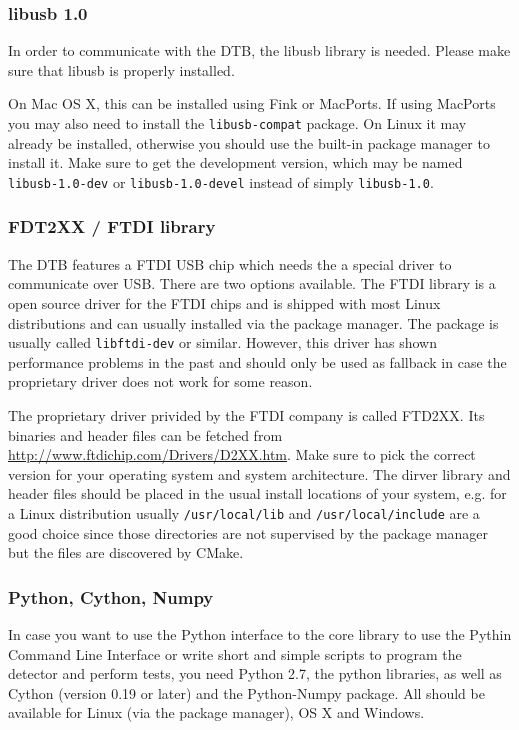 \subsubsection{libusb 1.0}
In order to communicate with the \gls{DTB}, the libusb library is needed. Please make sure that libusb is properly installed.

On Mac OS X, this can be installed using Fink or MacPorts. If using MacPorts you may also need to install the \texttt{libusb-compat} package. On Linux it may already be installed, otherwise you should use the built-in package manager to install it.
Make sure to get the development version, which may be named \texttt{libusb-1.0-dev} or \texttt{libusb-1.0-devel} instead of simply \texttt{libusb-1.0}.

\subsubsection{FDT2XX / FTDI library}
The DTB features a FTDI USB chip which needs the a special driver to communicate over USB. There are two options available. The FTDI library is a open source driver for the FTDI chips and is shipped with most Linux distributions and can usually installed via the package manager. The package is usually called \texttt{libftdi-dev} or similar. However, this driver has shown performance problems in the past and should only be used as fallback in case the proprietary driver does not work for some reason.

The proprietary driver privided by the FTDI company is called FTD2XX. Its binaries and header files can be fetched from \url{http://www.ftdichip.com/Drivers/D2XX.htm}. Make sure to pick the correct version for your operating system and system architecture. The dirver library and header files should be placed in the usual install locations of your system, e.g. for a Linux distribution usually \texttt{/usr/local/lib} and \texttt{/usr/local/include} are a good choice since those directories are not supervised by the package manager but the files are discovered by CMake.

\subsubsection{Python, Cython, Numpy}
In case you want to use the Python interface to the \pxar core library to use the Pythin Command Line Interface or write short and simple scripts to program the detector and perform tests, you need Python 2.7, the python libraries, as well as Cython (version 0.19 or later) and the Python-Numpy package. All should be available for Linux (via the package manager), OS X and Windows.


